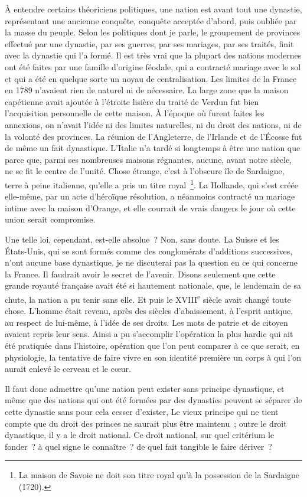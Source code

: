 \documentclass[french,twoside]{book} %
\newcommand\orgName[1]{#1}
\newcommand\placeName[1]{#1}
\newcommand\chaptercont{} %
\begin{document}
\chaptercont
\noindent À entendre certains théoriciens politiques, une nation est avant tout une dynastie, représentant une ancienne conquête, conquête acceptée d’abord, puis oubliée par la masse du peuple. Selon les politiques dont je parle, le groupement de provinces effectué par une dynastie, par ses guerres, par ses mariages, par ses traités, finit avec la dynastie qui l’a formé. Il est très vrai que la plupart des nations modernes ont été faites par une famille d’origine féodale, qui a contracté mariage avec le sol et qui a été en quelque sorte un noyau de centralisation. Les limites de la {\placeName France} en 1789 n’avaient rien de naturel ni de nécessaire. La large zone que la {\orgName maison capétienne} avait ajoutée à l’étroite lisière du traité de Verdun fut bien l’acquisition personnelle de cette maison. À l’époque où furent faites les annexions, on n’avait l’idée ni des limites naturelles, ni du droit des nations, ni de la volonté des provinces. La réunion de l’{\placeName Angleterre}, de l’{\placeName Irlande} et de l’{\placeName Écosse} fut de même un fait dynastique. L’{\placeName Italie} n’a tardé si longtemps à être une nation que parce que, parmi ses nombreuses maisons régnantes, aucune, avant notre siècle, ne se fit le centre de l’unité. Chose étrange, c’est à l’obscure île de {\placeName Sardaigne}, terre à peine italienne, qu’elle a pris un titre royal \footnote{La {\orgName maison de Savoie} ne doit son titre royal qu’à la possession de la {\placeName Sardaigne} (1720).}. La {\placeName Hollande}, qui s’est créée elle-même, par un acte d’héroïque résolution, a néanmoins contracté un mariage intime avec la {\orgName maison d’Orange}, et elle courrait de vrais dangers le jour où cette union serait compromise.\par
Une telle loi, cependant, est-elle absolue ? Non, sans doute. La {\placeName Suisse} et les {\placeName États-Unis}, qui se sont formés comme des conglomérats d’additions successives, n’ont aucune base dynastique. je ne discuterai pas la question en ce qui concerne la {\placeName France}. Il faudrait avoir le secret de l’avenir. Disons seulement que cette grande royauté française avait été si hautement nationale, que, le lendemain de sa chute, la nation a pu tenir sans elle. Et puis le XVIII\textsuperscript{e} siècle avait changé toute chose. L’homme était revenu, après des siècles d’abaissement, à l’esprit antique, au respect de lui-même, à l’idée de ses droits. Les mots de patrie et de citoyen avaient repris leur sens. Ainsi a pu s’accomplir l’opération la plus hardie qui ait été pratiquée dans l’histoire, opération que l’on peut comparer à ce que serait, en physiologie, la tentative de faire vivre en son identité première un corps à qui l’on aurait enlevé le cerveau et le cœur.\par
Il faut donc admettre qu’une nation peut exister sans principe dynastique, et même que des nations qui ont été formées par des dynasties peuvent se séparer de cette dynastie sans pour cela cesser d’exister, Le vieux principe qui ne tient compte que du droit des princes ne saurait plus être maintenu ; outre le droit dynastique, il y a le droit national. Ce droit national, sur quel critérium le fonder ? à quel signe le connaître ? de quel fait tangible le faire dériver ?\par
\end{document}
